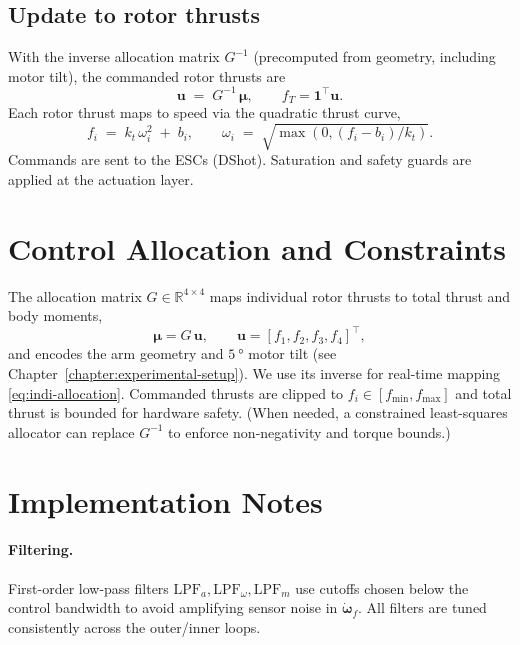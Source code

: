 \subsection{Update to rotor thrusts}\label{sec:indi-to-rotors}
With the inverse allocation matrix $G^{-1}$ (precomputed from geometry, including motor tilt),
the commanded rotor thrusts are
\begin{equation}
\mathbf{u} \;=\; G^{-1}\,\boldsymbol{\mu},
\qquad f_T=\mathbf{1}^\top\mathbf{u}.
\label{eq:indi-allocation}
\end{equation}
Each rotor thrust maps to speed via the quadratic thrust curve,
\begin{equation}
f_i \;=\; k_t\,\omega_i^2 \;+\; b_i,
\qquad
\omega_i \;=\; \sqrt{\max(0,(f_i-b_i)/k_t)}.
\label{eq:thrust-map}
\end{equation}
Commands are sent to the ESCs (DShot). Saturation and safety guards are applied at the actuation layer.

\section{Control Allocation and Constraints}\label{sec:allocation}
The allocation matrix $G\in\mathbb{R}^{4\times 4}$ maps individual rotor thrusts to total thrust
and body moments,
\begin{equation}
\boldsymbol{\mu}=G\,\mathbf{u},
\qquad
\mathbf{u}=[f_1,f_2,f_3,f_4]^\top,
\end{equation}
and encodes the arm geometry and $\SI{5}{\degree}$ motor tilt (see Chapter~\ref{chapter:experimental-setup}).
We use its inverse for real-time mapping \eqref{eq:indi-allocation}.
Commanded thrusts are clipped to $f_i\in[f_{\min},f_{\max}]$ and total thrust is bounded for hardware safety.
(When needed, a constrained least-squares allocator can replace $G^{-1}$ to enforce non-negativity and torque bounds.)

\section{Implementation Notes}\label{sec:impl-notes}
\paragraph{Filtering.}
First-order low-pass filters $\mathrm{LPF}_a,\mathrm{LPF}_\omega,\mathrm{LPF}_m$ use cutoffs
chosen below the control bandwidth to avoid amplifying sensor noise in $\dot{\boldsymbol{\omega}}_f$.
All filters are tuned consistently across the outer/inner loops.

